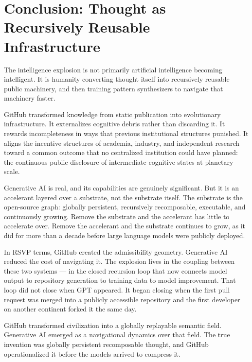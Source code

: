\documentclass[12pt]{article}
\begin{document}
\section{Conclusion: Thought as Recursively Reusable Infrastructure}

The intelligence explosion is not primarily artificial intelligence becoming
intelligent. It is humanity converting thought itself into recursively reusable
public machinery, and then training pattern synthesizers to navigate that
machinery faster.

GitHub transformed knowledge from static publication into evolutionary
infrastructure. It externalizes cognitive debris rather than discarding it. It
rewards incompleteness in ways that previous institutional structures punished.
It aligns the incentive structures of academia, industry, and independent
research toward a common outcome that no centralized institution could have
planned: the continuous public disclosure of intermediate cognitive states at
planetary scale.

Generative AI is real, and its capabilities are genuinely significant. But it is
an accelerant layered over a substrate, not the substrate itself. The substrate
is the open-source graph: globally persistent, recursively recomposable,
executable, and continuously growing. Remove the substrate and the accelerant has
little to accelerate over. Remove the accelerant and the substrate continues to
grow, as it did for more than a decade before large language models were publicly
deployed.

In RSVP terms, GitHub created the admissibility geometry. Generative AI reduced
the cost of navigating it. The explosion lives in the coupling between these two
systems --- in the closed recursion loop that now connects model output to
repository generation to training data to model improvement. That loop did not
close when GPT appeared. It began closing when the first pull request was merged
into a publicly accessible repository and the first developer on another
continent forked it the same day.

GitHub transformed civilization into a globally replayable semantic field.
Generative AI emerged as a navigational dynamics over that field. The true
invention was globally persistent recomposable thought, and GitHub
operationalized it before the models arrived to compress it.
\end{document}
